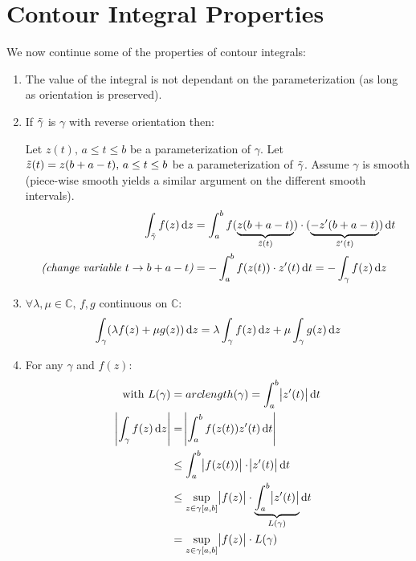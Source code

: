 \section{Contour Integral Properties}

We now continue some of the properties of contour integrals:

\begin{enumerate}
    \item The value of the integral is not dependant on the parameterization (as long as orientation is preserved).
    \item If $\Tilde{\gamma}$ is $\gamma$ with reverse orientation then:
    
    Let $z(t), \, a\leq t \leq b$ be a parameterization of $\gamma$. Let $\Tilde{z}(t) = z(b+a-t), \, a\leq t \leq b$ be a parameterization of $\Tilde{\gamma}$. Assume $\gamma$ is smooth (piece-wise smooth yields a similar argument on the different smooth intervals).
    \begin{align*}
         \int_{\Tilde{\gamma}} f(z)  \dif z &= \int_{a}^b f( \underbrace{z(b+a-t)}_{\Tilde{z}(t)}) \cdot (\underbrace{-z'(b+a-t)}_{\Tilde{z}'(t)})  \dif t\\
        \textit{(change variable $t \to b+a -t$)}  &= - \int_a^b f(z(t))\cdot z'(t) \dif t = - \int_{\gamma} f(z)  \dif z
    \end{align*}
    
    \item $\forall \lambda, \mu \in \mathbb{C}, \, f,g$ continuous on $\mathbb{C}$:
    \begin{align*}
        \int_{\gamma} (\lambda f(z) + \mu g(z))  \dif z = \lambda \int_{\gamma} f(z)  \dif z + \mu \int_{\gamma} g(z)  \dif z
    \end{align*}
    
    \item For any $\gamma$ and $f(z)$:
    \begin{align*}
    \text{with } L(\gamma) &= arclength(\gamma) = \int_a^b \abs{z'(t)}  \dif t\\
    \abs{\int_{\gamma} f(z)  \dif z} &= \abs{\int_a^b f(z(t)) z'(t)  \dif t}\\
    &\leq \int_a^b \abs{f(z(t))} \cdot \abs{z'(t)}  \dif t\\
    &\leq \sup_{z \in \gamma[a,b]} \abs{f(z)} \cdot \underbrace{\int_a^b \abs{z'(t)}}_{L(\gamma)}  \dif t\\
    &= \sup\limits_{z \in \gamma[a,b]} \abs{f(z)} \cdot L(\gamma)
    \end{align*}
   
   
\end{enumerate}


